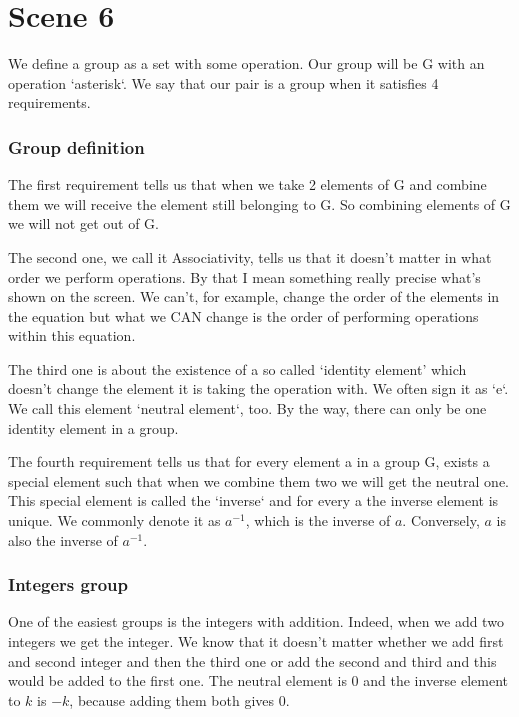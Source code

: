 \documentclass[12pt]{article}
\newcommand{\mybox}[1]{\colorbox{Goldenrod2}{#1}}
\newcommand{\myboxx}[1]{\colorbox{SkyBlue2}{#1}}
\begin{document}
\section*{\mybox{Scene 6}}
    We define a group as a set with some operation. Our group will be G with an operation `asterisk`. We say that our pair is a group when it satisfies 4 requirements.

    \subsubsection*{\myboxx{Group definition}}
    The first requirement tells us that when we take 2 elements of G and combine them we will receive the element still belonging to G. So combining elements of G we will not get out of G.

    The second one, we call it Associativity, tells us that it doesn't matter in what order we perform operations. By that I mean something really precise what's shown on the screen. We can't, for example, change the order of the elements in the equation but what we CAN change is the order of performing operations within this equation.

    The third one is about the existence of a so called `identity element' which doesn't change the element it is taking the operation with. We often sign it as `e`. We call this element `neutral element`, too. By the way, there can only be one identity element in a group.


    The fourth requirement tells us that for every element a in a group G, exists a special element such that when we combine them two we will get the neutral one. This special element is called the `inverse` and for every a the inverse element is unique. We commonly denote it as $a^{-1}$, which is the inverse of $a$. Conversely, $a$ is also the inverse of $a^{-1}$.
    
    \subsubsection*{\myboxx{Integers group}}
    One of the easiest groups is the integers with addition. Indeed, when we add two integers we get the integer. We know that it doesn't matter whether we add first and second integer and then the third one or add the second and third and this would be added to the first one. The neutral element is 0 and the inverse element to $k$ is $-k$, because adding them both gives 0.
\end{document}
